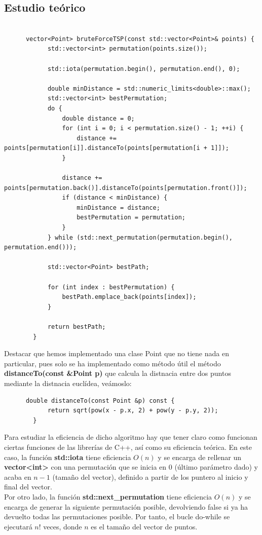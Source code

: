 \documentclass[11pt,openany]{book}
\begin{document}
\subsection{Estudio teórico}
\begin{lstlisting}

      vector<Point> bruteForceTSP(const std::vector<Point>& points) {
            std::vector<int> permutation(points.size());
      
            std::iota(permutation.begin(), permutation.end(), 0);
        
            double minDistance = std::numeric_limits<double>::max();
            std::vector<int> bestPermutation;
            do {
                double distance = 0;
                for (int i = 0; i < permutation.size() - 1; ++i) {
                    distance += points[permutation[i]].distanceTo(points[permutation[i + 1]]);
                }
        
                distance += points[permutation.back()].distanceTo(points[permutation.front()]);
                if (distance < minDistance) {
                    minDistance = distance;
                    bestPermutation = permutation;
                }
            } while (std::next_permutation(permutation.begin(), permutation.end()));
        
            std::vector<Point> bestPath;
        
            for (int index : bestPermutation) {
                bestPath.emplace_back(points[index]);
            }
        
            return bestPath;
        }
\end{lstlisting}
Destacar que hemos implementado una clase Point que no tiene nada en particular, pues solo se ha implementado
como método útil el método \textbf{distanceTo(const \&Point p)} que calcula la distnacia entre dos puntos
mediante la distnacia euclídea, veámoslo:
\begin{lstlisting}
      double distanceTo(const Point &p) const {
            return sqrt(pow(x - p.x, 2) + pow(y - p.y, 2));
        }
\end{lstlisting}
Para estudiar la eficiencia de dicho algoritmo hay que tener claro como funcionan ciertas funciones de las librerías de C++, así como
su eficiencia teórica. En este caso, la función \textbf{std::iota} tiene eficiencia $O(n)$ y se encarga de rellenar un \textbf{vector<int>}
con una permutación que se inicia en $0$ (último parámetro dado) y acaba en $n-1$ (tamaño del vector), definido a partir de los puntero al inicio
y final del vector. \\
Por otro lado, la función \textbf{std::next\_permutation} tiene eficiencia $O(n)$ y se encarga de generar la siguiente permutación posible, devolviendo
false si ya ha devuelto todas las permutaciones posible. Por tanto, el bucle do-while se ejecutará $n!$ veces, donde $n$ es el tamaño del vector de puntos. \\ \\
\end{document}
